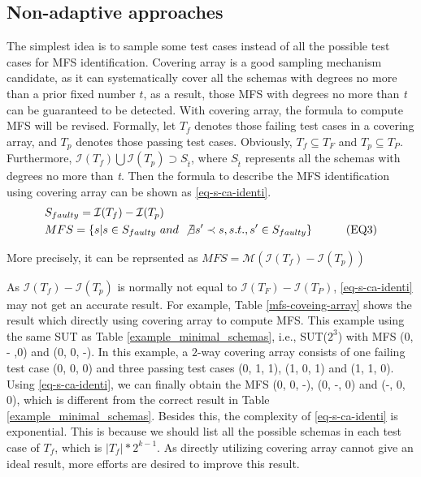 \documentclass[10pt,journal,cspaper,compsoc]{IEEEtran}
\begin{document}
\subsection{Non-adaptive approaches}
The simplest idea is to sample some test cases instead of all the possible test cases for MFS identification. Covering array is a good sampling mechanism candidate, as it can systematically cover all the schemas with degrees no more than a prior fixed number $t$, as a result, those MFS with degrees no more than \emph{t} can be guaranteed to be detected. With covering array, the formula to compute MFS will be revised. Formally, let $T_{f}$ denotes those failing test cases in a covering array, and $T_{p}$ denotes those passing test cases. Obviously, $T_{f} \subseteq T_{F}$ and $T_{p} \subseteq T_{P}$. Furthermore, $ \mathcal{I}(T_{f}) \bigcup \mathcal{I}(T_{p}) \supset S_{\hat{t}}$, where $S_{\hat{t}}$ represents all the schemas with degrees no more than \emph{t}. Then the formula to describe the MFS identification using covering array can be shown as \ref{eq-s-ca-identi}.
\begin{alignat}{2}
 &  S_{faulty} = \mathcal{I}(T_{f}) - \mathcal{I}(T_{p})  &{}&   \nonumber \\
& MFS =  \{s | s \in S_{faulty}\ and\ \not\exists s' \prec s, s.t., s' \in S_{faulty}\} &{}& \tag{EQ3} \label{eq-s-ca-identi} \nonumber
\end{alignat}

More precisely, it can be reprsented as $MFS = \mathcal{M}(\mathcal{I}(T_{f}) - \mathcal{I}(T_{p}))$

As  $\mathcal{I}(T_{f}) - \mathcal{I}(T_{p})$ is normally not equal to  $\mathcal{I}(T_{F}) - \mathcal{I}(T_{P})$, \ref{eq-s-ca-identi} may not get an accurate result. For example,  Table \ref{mfs-coveing-array} shows the result which directly using covering array to compute MFS. This example using the same SUT as Table \ref{example_minimal_schemas}, i.e., SUT($2^{3}$) with MFS (0, - ,0) and (0, 0, -). In this example, a $2$-way covering array consists of one failing test case (0, 0, 0) and three passing test cases (0, 1, 1), (1, 0, 1) and (1, 1, 0). Using \ref{eq-s-ca-identi}, we can finally obtain the MFS (0, 0, -), (0, -, 0) and (-, 0, 0), which is different from the correct result in Table \ref{example_minimal_schemas}. Besides this, the complexity of \ref{eq-s-ca-identi} is exponential. This is because we should list all the possible schemas in each test case of $T_{f}$, which is $|T_{f}| * 2 ^ {k - 1}$. As directly utilizing covering array cannot give an ideal result, more efforts are desired to improve this result.
\end{document}
